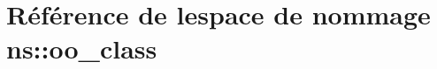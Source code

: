 \hypertarget{namespacens_1_1oo__class}{}\section{Référence de l\textquotesingle{}espace de nommage ns\+:\+:oo\+\_\+class}
\label{namespacens_1_1oo__class}

